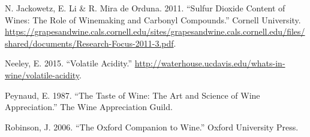 \documentclass[]{article}
\begin{document}
\hypertarget{ref-Jac2011}{}
N. Jackowetz, E. Li \& R. Mira de Orduna. 2011. ``Sulfur Dioxide Content
of Wines: The Role of Winemaking and Carbonyl Compounds.'' Cornell
University.
\url{https://grapesandwine.cals.cornell.edu/sites/grapesandwine.cals.cornell.edu/files/shared/documents/Research-Focus-2011-3.pdf}.

\hypertarget{ref-Nel2015}{}
Neeley, E. 2015. ``Volatile Acidity.''
\url{http://waterhouse.ucdavis.edu/whats-in-wine/volatile-acidity}.

\hypertarget{ref-Pay1987}{}
Peynaud, E. 1987. ``The Taste of Wine: The Art and Science of Wine
Appreciation.'' The Wine Appreciation Guild.

\hypertarget{ref-Rob2006}{}
Robinson, J. 2006. ``The Oxford Companion to Wine.'' Oxford University
Press.
\end{document}
